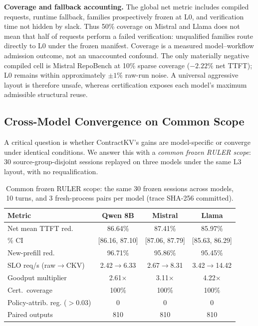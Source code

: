 \documentclass[journal]{IEEEtran}
\begin{document}
\smallskip
\noindent\textbf{Coverage and fallback accounting.}
The global net metric includes compiled requests, runtime fallback, families prospectively frozen at L0, and verification time not hidden by slack. Thus 50\% coverage on Mistral and Llama does not mean that half of requests perform a failed verification: unqualified families route directly to L0 under the frozen manifest. Coverage is a measured model--workflow admission outcome, not an unaccounted confound. The only materially negative compiled cell is Mistral RepoBench at 10\% sparse coverage ($-2.22\%$ net TTFT); L0 remains within approximately $\pm1\%$ raw-run noise. A universal aggressive layout is therefore unsafe, whereas certification exposes each model's maximum admissible structural reuse.

\subsection{Cross-Model Convergence on Common Scope}
\label{sec:cross_model}

A critical question is whether ContractKV's gains are model-specific or converge under identical conditions. We answer this with a \emph{common frozen RULER scope}: 30 source-group-disjoint sessions replayed on three models under the same L3 layout, with no requalification.

\begin{table}[t]
\centering
\caption{Common frozen RULER scope: the same 30 frozen sessions across models, 10 turns, and 3 fresh-process pairs per model (trace SHA-256 committed).}
\label{tab:common_ruler}
\scriptsize
\begin{tabular}{@{}lccc@{}}
\toprule
\textbf{Metric} & \textbf{Qwen 8B} & \textbf{Mistral} & \textbf{Llama} \\
\midrule
Net mean TTFT red. & 86.64\% & 87.41\% & 85.97\% \\
\quad 95\% CI & [86.16, 87.10] & [87.06, 87.79] & [85.63, 86.29] \\
New-prefill red. & 96.71\% & 95.86\% & 95.45\% \\
SLO req/s (raw$\to$CKV) & 2.42$\to$6.33 & 2.67$\to$8.31 & 3.42$\to$14.42 \\
Goodput multiplier & 2.61$\times$ & 3.11$\times$ & 4.22$\times$ \\
\midrule
Cert.\ coverage & 100\% & 100\% & 100\% \\
Policy-attrib. reg. ($>0.03$) & 0 & 0 & 0 \\
Paired outputs & 810 & 810 & 810 \\
\bottomrule
\end{tabular}
\end{table}
\end{document}
